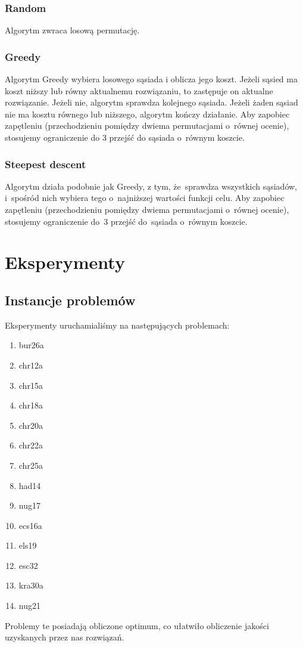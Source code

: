 \documentclass[a4paper,10pt]{article}
\begin{document}
\subsubsection{Random}
Algorytm zwraca losową permutację.

\subsubsection{Greedy}
Algorytm Greedy wybiera losowego sąsiada i oblicza jego koszt.
Jeżeli sąsied ma koszt niższy lub równy aktualnemu rozwiązaniu, to zastępuje on aktualne rozwiązanie.
Jeżeli nie, algorytm sprawdza kolejnego sąsiada.
Jeżeli żaden sąsiad nie ma kosztu równego lub niższego, algorytm kończy działanie.
Aby zapobiec zapętleniu (przechodzieniu pomiędzy dwiema permutacjami o~równej ocenie), stosujemy ograniczenie do 3 przejść do sąsiada o~równym koszcie.

\subsubsection{Steepest descent}
Algorytm działa podobnie jak Greedy, z tym, że~sprawdza wszystkich sąsiadów, i~spośród nich wybiera tego
o~najniższej wartości funkcji celu.
Aby zapobiec zapętleniu (przechodzieniu pomiędzy dwiema permutacjami o~równej ocenie),
stosujemy ograniczenie do~3 przejść do~sąsiada o~równym koszcie.

\section{Eksperymenty}
\subsection{Instancje problemów}
Eksperymenty uruchamialiśmy na następujących problemach:
\begin{enumerate}
\item bur26a
\item chr12a
\item chr15a
\item chr18a
\item chr20a
\item chr22a
\item chr25a
\item had14
\item nug17
\item ecs16a
\item els19
\item esc32
\item kra30a
\item nug21
\end{enumerate}
Problemy te posiadają obliczone optimum, co ułatwiło obliczenie jakości uzyskanych przez nas rozwiązań.
\end{document}
